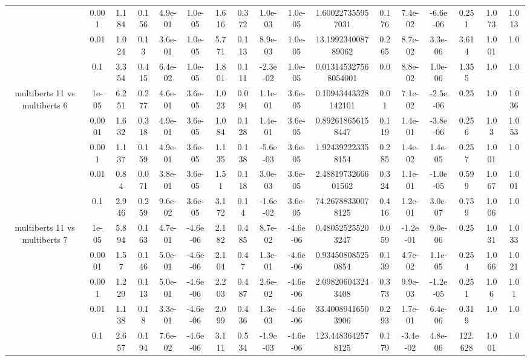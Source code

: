 \begin{tabular}{|c|c|c|c|c|c|c|c|c|c|c|c|c|c|c|c|c|}
 & 0.001 & 1.184 & 0.156 & 4.9e-01 & 1.0e-05 & 1.616 & 0.372 & 1.0e-03 & 1.0e-05 & 1.600227355957031 & 0.176 & 7.4e-02 & -6.6e-06 & 0.251 & 1.073 & 1.013 \\
 & 0.01 & 1.024 & 0.13 & 3.6e-01 & 1.0e-05 & 5.771 & 0.113 & 8.9e-03 & 1.0e-05 & 13.199234008789062 & 0.265 & 8.7e-02 & 3.3e-06 & 3.614 & 1.001 & 1.0 \\
 & 0.1 & 3.354 & 0.415 & 6.4e-02 & 1.0e-05 & 1.801 & 0.111 & -2.3e-02 & 1.0e-05 & 0.013145327568054001 & 0.0 & 8.8e-02 & 1.0e-06 & 1.355 & 1.0 & 1.0 \\
\hline
\multirow{5}{*}{multiberts 11 vs multiberts 6} & 1e-05 & 6.251 & 0.277 & 4.6e-01 & 3.6e-05 & 1.023 & 0.094 & 1.1e-01 & 3.6e-05 & 0.10943443328142101 & 0.01 & 7.1e-02 & -2.5e-06 & 0.25 & 1.0 & 1.036 \\
 & 0.0001 & 1.632 & 0.318 & 4.9e-01 & 3.6e-05 & 1.084 & 0.128 & 1.4e-01 & 3.6e-05 & 0.892618656158447 & 0.119 & 1.4e-01 & -3.8e-06 & 0.256 & 1.03 & 1.053 \\
 & 0.001 & 1.137 & 0.159 & 4.9e-01 & 3.6e-05 & 1.135 & 0.138 & -5.6e-03 & 3.6e-05 & 1.924392223358154 & 0.285 & 1.4e-02 & 1.4e-05 & 0.257 & 1.001 & 1.0 \\
 & 0.01 & 0.84 & 0.071 & 3.8e-01 & 3.6e-05 & 1.51 & 0.118 & 3.0e-03 & 3.6e-05 & 2.4881973266601562 & 0.324 & 1.1e-01 & -1.0e-05 & 0.599 & 1.067 & 1.001 \\
 & 0.1 & 2.946 & 0.259 & 9.6e-02 & 3.6e-05 & 3.172 & 0.14 & -1.6e-02 & 3.6e-05 & 74.26788330078125 & 0.416 & 1.2e-01 & 3.0e-07 & 0.759 & 1.006 & 1.0 \\
\hline
\multirow{5}{*}{multiberts 11 vs multiberts 7} & 1e-05 & 5.894 & 0.163 & 4.7e-01 & -4.6e-06 & 2.182 & 0.485 & 8.7e-02 & -4.6e-06 & 0.480525255203247 & 0.059 & -1.2e-01 & 9.0e-06 & 0.25 & 1.031 & 1.033 \\
 & 0.0001 & 1.57 & 0.146 & 5.0e-01 & -4.6e-06 & 2.104 & 0.47 & 1.3e-01 & -4.6e-06 & 0.934508085250854 & 0.139 & 4.7e-02 & 1.1e-05 & 0.254 & 1.066 & 1.021 \\
 & 0.001 & 1.229 & 0.113 & 5.0e-01 & -4.6e-06 & 2.203 & 0.487 & 2.6e-02 & -4.6e-06 & 2.098206043243408 & 0.373 & 9.9e-03 & -1.2e-05 & 0.251 & 1.06 & 1.01 \\
 & 0.01 & 1.138 & 0.18 & 3.3e-01 & -4.6e-06 & 2.099 & 0.436 & 1.3e-03 & -4.6e-06 & 33.40089416503906 & 0.293 & 1.7e-01 & 6.4e-06 & 0.319 & 1.0 & 1.0 \\
 & 0.1 & 2.657 & 0.194 & 7.6e-02 & -4.6e-06 & 3.111 & 0.534 & -1.9e-03 & -4.6e-06 & 123.4483642578125 & 0.179 & -3.4e-02 & 4.8e-06 & 122.628 & 1.001 & 1.0 \\

\end{tabular}
